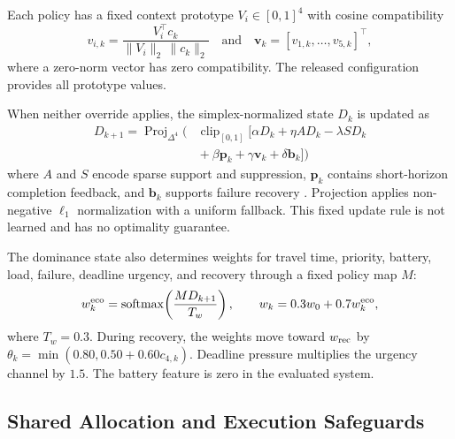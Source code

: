 \documentclass[10pt,letterpaper,onecolumn]{IEEEtran}
\begin{document}
\label{sec:dominance}

Each policy has a fixed context prototype $V_i\in[0,1]^4$ with cosine
compatibility
\begin{equation}
 v_{i,k}=\frac{V_i^\top c_k}{\|V_i\|_2\,\|c_k\|_2}
 \quad\text{and}\quad \mathbf v_k=[v_{1,k},\ldots,v_{5,k}]^\top,
 \label{eq:context-compatibility}
\end{equation}
where a zero-norm vector has zero compatibility. The released configuration
provides all prototype values.

When neither override applies, the simplex-normalized state $D_k$ is updated
as
\begin{equation}
\begin{aligned}
 D_{k+1}=\operatorname{Proj}_{\Delta^4}\!\Big(&
 \operatorname{clip}_{[0,1]}\big[\alpha D_k+\eta A D_k-\lambda S D_k\\
 &{}+\beta\mathbf p_k+\gamma\mathbf v_k+\delta\mathbf b_k\big]\Big)
\end{aligned}
\label{eq:dominance}
\end{equation}
where $A$ and $S$ encode sparse support and suppression, $\mathbf p_k$
contains short-horizon completion feedback, and $\mathbf b_k$ supports failure
recovery \cite{peng2023competition}. Projection applies non-negative
$\ell_1$ normalization with a uniform fallback. This fixed update rule is not
learned and has no optimality guarantee.

The dominance state also determines weights for travel time, priority, battery,
load, failure, deadline urgency, and recovery through a fixed policy map $M$:
\begin{equation}
  w^{\rm eco}_k=\operatorname{softmax}\!\left(\frac{MD_{k+1}}{T_w}\right),
  \qquad w_k=0.3w_0+0.7w^{\rm eco}_k,
  \label{eq:weights}
\end{equation}
where $T_w=0.3$. During recovery, the weights move toward $w_{\rm rec}$ by
$\theta_k=\min(0.80,0.50+0.60c_{4,k})$. Deadline pressure multiplies the
urgency channel by $1.5$. The battery feature is zero in the evaluated system.

\subsection{Shared Allocation and Execution Safeguards}
\end{document}
